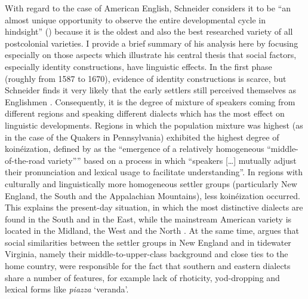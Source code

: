 With regard to the case of American English, Schneider considers it to be “an almost unique opportunity to observe the entire developmental cycle in hindsight” (\citeyear[251]{Schneider2007}) because it is the oldest and also the best researched variety of all postcolonial varieties. I provide a brief summary of his analysis here by focusing especially on those aspects which illustrate his central thesis that social factors, especially identity constructions, have linguistic effects. In the first phase (roughly from 1587 to 1670), evidence of identity constructions is scarce, but Schneider finds it very likely that the early settlers still perceived themselves as Englishmen \citep[258]{Schneider2007}. Consequently, it is the degree of mixture of speakers coming from different regions and speaking different dialects which has the most effect on linguistic developments. Regions in which the population mixture was highest (as in the case of the Quakers in Pennsylvania) exhibited the highest degree of koinéization, defined by \citet[35]{Schneider2007} as the “emergence of a relatively homogeneous “middle-of-the-road variety”” based on a process in which “speakers […] mutually adjust their pronunciation and lexical usage to facilitate understanding”. In regions with culturally and linguistically more homogeneous settler groups (particularly New England, the South and the Appalachian Mountains), less koinéization occurred. This explains the present-day situation, in which the most distinctive dialects are found in the South and in the East, while the mainstream American variety is located in the Midland, the West and the North \citep[261--262]{Schneider2007}. At the same time, \citet[262]{Schneider2007} argues that social similarities between the settler groups in New England and in tidewater Virginia, namely their middle-to-upper-class background and close ties to the home country, were responsible for the fact that southern and eastern dialects share a number of features, for example lack of rhoticity, yod-dropping and lexical forms like \emph{piazza} ‘veranda’.


